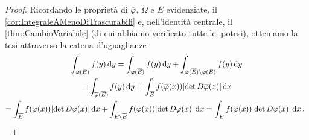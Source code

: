 \begin{proof}
	Ricordando le proprietà di $\overline\varphi$, $\overline\Omega$ e $\overline E$ evidenziate, il \cref{cor:IntegraleAMenoDiTrascurabili} e, nell'identità centrale, il \cref{thm:CambioVariabile} (di cui abbiamo verificato tutte le ipotesi), otteniamo la tesi attraverso la catena d'uguaglianze
	\begin{multline*}
		\int_{\varphi(E)} f(y)\,\mathrm d y=\int_{\varphi(\overline E)} f(y)\,\mathrm d y+\int_{\varphi(\overline E)\setminus\varphi(E)}f(y)\,\mathrm d y \\
		=\int_{\overline\varphi(\overline E)} f(y)\,\mathrm d y=\int_{\overline E} f(\overline\varphi(x))\lvert \det D\overline\varphi(x) \rvert \,\mathrm d x \\
		=\int_{\overline E}f(\varphi(x))\lvert \det D\varphi(x) \rvert \,\mathrm d x+
		 \int_{E\setminus\overline E}f(\varphi(x))\lvert \det D\varphi(x) \rvert \,\mathrm d x=\int_{E}f(\varphi(x))\lvert \det D\varphi(x) \rvert \,\mathrm d x \, \text{. }
	\end{multline*}
\end{proof}

